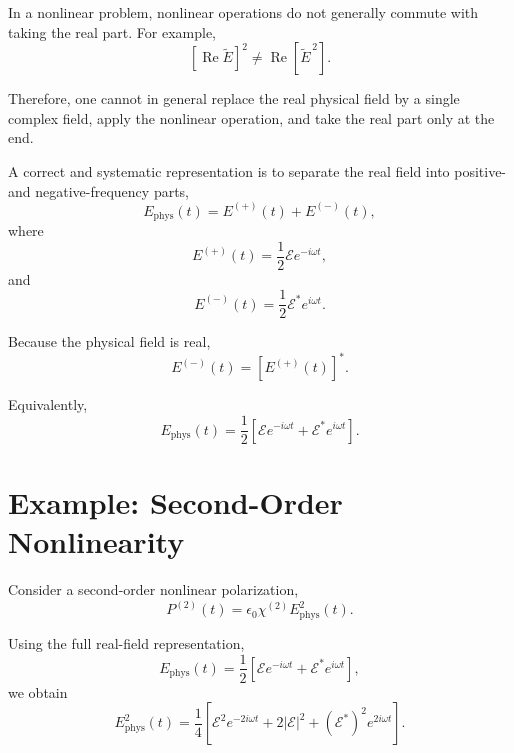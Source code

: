 \documentclass[11pt]{article}
\begin{document}
In a nonlinear problem, nonlinear operations do not generally commute with taking the real part. For example,
\begin{equation}
\left[
\operatorname{Re}\tilde{E}
\right]^2
\neq
\operatorname{Re}\!\left[
\tilde{E}^{\,2}
\right].
\end{equation}

Therefore, one cannot in general replace the real physical field by a single complex field, apply the nonlinear operation, and take the real part only at the end.

A correct and systematic representation is to separate the real field into positive- and negative-frequency parts,
\begin{equation}
E_{\mathrm{phys}}(t)
=
E^{(+)}(t)+E^{(-)}(t),
\end{equation}
where
\begin{equation}
E^{(+)}(t)
=
\frac{1}{2}\mathcal{E}e^{-i\omega t},
\end{equation}
and
\begin{equation}
E^{(-)}(t)
=
\frac{1}{2}\mathcal{E}^{*}e^{i\omega t}.
\end{equation}

Because the physical field is real,
\begin{equation}
E^{(-)}(t)
=
\left[E^{(+)}(t)\right]^*.
\end{equation}

Equivalently,
\begin{equation}
E_{\mathrm{phys}}(t)
=
\frac{1}{2}
\left[
\mathcal{E}e^{-i\omega t}
+
\mathcal{E}^{*}e^{i\omega t}
\right].
\end{equation}

\section{Example: Second-Order Nonlinearity}

Consider a second-order nonlinear polarization,
\begin{equation}
P^{(2)}(t)
=
\epsilon_0\chi^{(2)}
E_{\mathrm{phys}}^2(t).
\end{equation}

Using the full real-field representation,
\begin{equation}
E_{\mathrm{phys}}(t)
=
\frac{1}{2}
\left[
\mathcal{E}e^{-i\omega t}
+
\mathcal{E}^{*}e^{i\omega t}
\right],
\end{equation}
we obtain
\begin{equation}
E_{\mathrm{phys}}^2(t)
=
\frac{1}{4}
\left[
\mathcal{E}^2e^{-2i\omega t}
+
2|\mathcal{E}|^2
+
(\mathcal{E}^{*})^2e^{2i\omega t}
\right].
\end{equation}
\end{document}

